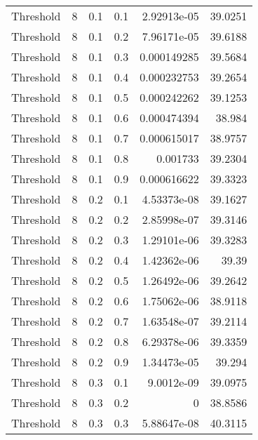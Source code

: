 \documentclass{article}
\begin{document}
\begin{longtable}[H]{lrrrrr}
 Threshold      &       8 &   0.1 &            0.1 &   2.92913e-05 &         39.0251 \\
 Threshold      &       8 &   0.1 &            0.2 &   7.96171e-05 &         39.6188 \\
 Threshold      &       8 &   0.1 &            0.3 &   0.000149285 &         39.5684 \\
 Threshold      &       8 &   0.1 &            0.4 &   0.000232753 &         39.2654 \\
 Threshold      &       8 &   0.1 &            0.5 &   0.000242262 &         39.1253 \\
 Threshold      &       8 &   0.1 &            0.6 &   0.000474394 &         38.984  \\
 Threshold      &       8 &   0.1 &            0.7 &   0.000615017 &         38.9757 \\
 Threshold      &       8 &   0.1 &            0.8 &   0.001733    &         39.2304 \\
 Threshold      &       8 &   0.1 &            0.9 &   0.000616622 &         39.3323 \\
 Threshold      &       8 &   0.2 &            0.1 &   4.53373e-08 &         39.1627 \\
 Threshold      &       8 &   0.2 &            0.2 &   2.85998e-07 &         39.3146 \\
 Threshold      &       8 &   0.2 &            0.3 &   1.29101e-06 &         39.3283 \\
 Threshold      &       8 &   0.2 &            0.4 &   1.42362e-06 &         39.39   \\
 Threshold      &       8 &   0.2 &            0.5 &   1.26492e-06 &         39.2642 \\
 Threshold      &       8 &   0.2 &            0.6 &   1.75062e-06 &         38.9118 \\
 Threshold      &       8 &   0.2 &            0.7 &   1.63548e-07 &         39.2114 \\
 Threshold      &       8 &   0.2 &            0.8 &   6.29378e-06 &         39.3359 \\
 Threshold      &       8 &   0.2 &            0.9 &   1.34473e-05 &         39.294  \\
 Threshold      &       8 &   0.3 &            0.1 &   9.0012e-09  &         39.0975 \\
 Threshold      &       8 &   0.3 &            0.2 &   0           &         38.8586 \\
 Threshold      &       8 &   0.3 &            0.3 &   5.88647e-08 &         40.3115 \\

\end{longtable}
\end{document}
